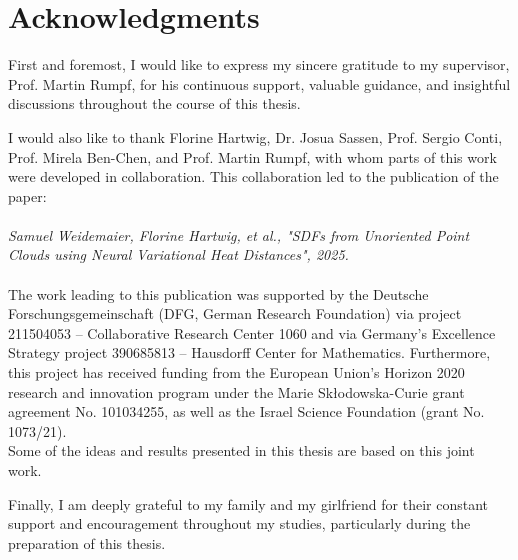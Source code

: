 \documentclass[12pt,openany]{book}
\theoremstyle{plainnormal}
\theoremstyle{remark}
\begin{document}
\section*{Acknowledgments}
\endgroup
First and foremost, I would like to express my sincere gratitude to my supervisor, Prof. Martin Rumpf, for his continuous support, valuable guidance, and insightful discussions throughout the course of this thesis.
\par
I would also like to thank Florine Hartwig, Dr. Josua Sassen, Prof. Sergio Conti, Prof. Mirela Ben-Chen, and Prof. Martin Rumpf, with whom parts of this work were developed in collaboration. This collaboration led to the publication of the paper:\\
\hspace{0.5em}\\
\textit{Samuel Weidemaier, Florine Hartwig, et al., "SDFs from Unoriented Point Clouds using Neural Variational
Heat Distances", 2025.}\\
\hspace{0.5em}
\\
The work leading to this publication was supported by the Deutsche Forschungsgemeinschaft (DFG, German Research Foundation) via project 211504053 -- Collaborative Research Center 1060 and via Germany’s Excellence Strategy project 390685813 -- Hausdorff Center for Mathematics.
Furthermore, this project has received funding from the European Union’s Horizon 2020 research and innovation program under the Marie Skłodowska-Curie grant agreement No. 101034255, as well as the Israel Science Foundation (grant No. 1073/21).\\
Some of the ideas and results presented in this thesis are based on this joint work.\par 
\noindent
Finally, I am deeply grateful to my family and my girlfriend for their constant support and encouragement throughout my studies, particularly during the preparation of this thesis.
\clearpage

\tableofcontents
\end{document}
